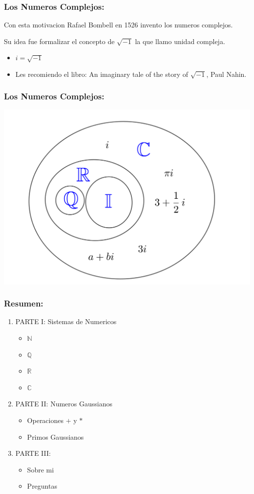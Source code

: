 \documentclass{beamer}
\def\CC{{\mathbb C}}
\def\NN{{\mathbb N}}
\def\QQ{{\mathbb Q}}
\def\RR{{\mathbb R}}
\theoremstyle{thmstyle}
\theoremstyle{thmstyle}
\theoremstyle{thmstyle}
\theoremstyle{mystyle}
\theoremstyle{qstnstyle}
\begin{document}
\begin{frame}
\frametitle{Los Numeros Complejos:}
Con esta motivacion Rafael Bombell en 1526 invento los numeros complejos. 

\pause
\vspace{5mm}
Su idea fue formalizar el concepto de $\sqrt{-1}$ la que llamo unidad compleja.

\pause
\vspace{5mm}
\begin{itemize}
\item $i=\sqrt{-1}$ 


\item Les recomiendo el libro: An imaginary tale of the story of $\sqrt{-1}$, Paul Nahin.
\end{itemize}
\end{frame}

\begin{frame}
\frametitle{Los Numeros Complejos:}
\begin{center}
\includegraphics[width=0.8\linewidth]{Image7.png}
\end{center}
\end{frame}


\begin{frame}
\frametitle{Resumen:}

\begin{enumerate}
\item PARTE I: Sistemas de Numericos
\begin{itemize}
\item $\NN$
\item $\QQ$
\item $\RR$
\item $\CC$
\end{itemize}

\item PARTE II: Numeros Gaussianos
\begin{itemize}
\item Operaciones $+$ y $*$
\item Primos Gaussianos
\end{itemize}


\item PARTE III: 
\begin{itemize}
\item Sobre mi

\item Preguntas
\end{itemize}
\end{enumerate}
\end{frame}
\end{document}
